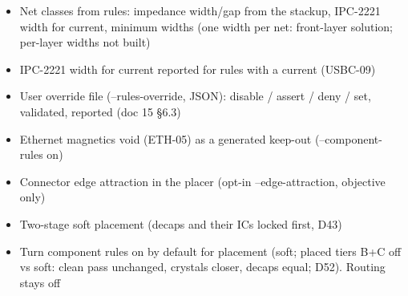 \begin{itemize}[leftmargin=1.6em,itemsep=1pt]
\item[\textcolor{fraqua}{$\checkmark$}] Net classes from rules: impedance width/gap from the stackup, IPC-2221 width for current, minimum widths (one width per net: front-layer solution; per-layer widths not built)
\item[\textcolor{fraqua}{$\checkmark$}] IPC-2221 width for current reported for rules with a current (USBC-09)
\item[\textcolor{fraqua}{$\checkmark$}] User override file (--rules-override, JSON): disable / assert / deny / set, validated, reported (doc 15 \S6.3)
\item[\textcolor{fraqua}{$\checkmark$}] Ethernet magnetics void (ETH-05) as a generated keep-out (--component-rules on)
\item[\textcolor{fraqua}{$\checkmark$}] Connector edge attraction in the placer (opt-in --edge-attraction, objective only)
\item[\textcolor{fraqua}{$\checkmark$}] Two-stage soft placement (decaps and their ICs locked first, D43)
\item[\textcolor{fraqua}{$\checkmark$}] Turn component rules on by default for placement (soft; placed tiers B+C off vs soft: clean pass unchanged, crystals closer, decaps equal; D52). Routing stays off
\end{itemize}
